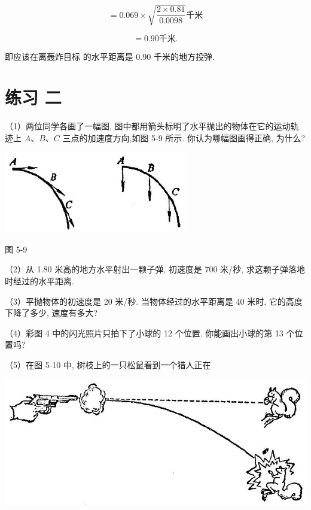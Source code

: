 \documentclass[10pt]{article}
\begin{document}
\[
= {0.069} \times \sqrt{\frac{2 \times {0.81}}{0.0098}}\text{千米}
\]

\[
= {0.90}\text{千米.}
\]

即应该在离轰炸目标 的水平距离是 0.90 千米的地方投弹.

\section*{练习 二}

（1）两位同学各画了一幅图, 图中都用箭头标明了水平抛出的物体在它的运动轨迹上 \(A\text{、}B\text{、}C\) 三点的加速度方向,如图 5-9 所示. 你认为哪幅图画得正确, 为什么?

\begin{center}
\includegraphics[max width=0.6\textwidth]{images/01912d55-147c-70aa-b0e0-1782a122f948_136_672508.jpg}
\end{center}

图 5-9

（2）从 1.80 米高的地方水平射出一颗子弹, 初速度是 700 米/秒, 求这颗子弹落地时经过的水平距离.

（3）平抛物体的初速度是 20 米/秒. 当物体经过的水平距离是 40 米时, 它的高度下降了多少, 速度有多大?

（4）彩图 4 中的闪光照片只拍下了小球的 12 个位置. 你能画出小球的第 13 个位置吗?

（5）在图 5-10 中, 树枝上的一只松鼠看到一个猎人正在

\begin{center}
\includegraphics[max width=1.0\textwidth]{images/01912d55-147c-70aa-b0e0-1782a122f948_137_338143.jpg}
\end{center}
\end{document}
